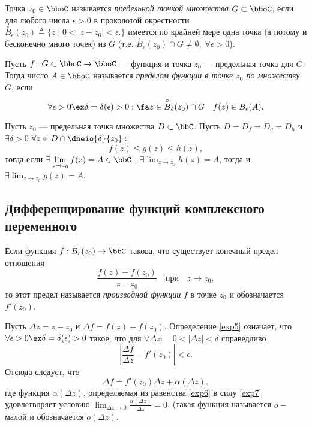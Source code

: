 \begin{defn}
Точка $z_0 \in \bboC$ называется \textit{предельной точкой множества} $G \subset \bboC$, если для любого числа $\epsilon > 0$ в проколотой окрестности $\overset{\circ} {B}_\epsilon(z_0)\triangleq \{z \;\bigl|\; 0<|z-z_0|<\epsilon \bigl.\}$ имеется по крайней мере одна точка (а потому и бесконечно много точек) из $G$ (т.е. $\overset{\circ} {B}_\epsilon(z_0) \cap G \neq \emptyset,\; \forall\epsilon > 0$).
\end{defn}

\begin{defn}
Пусть $f: G\subset \bboC \to \bboC$ --- функция и точка $z_0$ --- предельная точка для $G$. Тогда число $A \in \bboC$ называется \textit{пределом функции в точке $z_0$ по множеству $G$}, если 
$$
\forall \epsilon > 0 \ex \delta = \delta(\epsilon)>0:\fa z \in \overset{\circ} {B}_\delta(z_0)\cap G \quad f(z) \in B_\epsilon(A). 
$$ 
\end{defn}

\begin{thm} 
\label{exp14}
Пусть $z_0$ --- предельная точка множества $D\subset \bbC$. Пусть $D = D_f=D_g=D_h$ и $\exists \delta > 0$ $\forall z \in D \cap \dneio{\delta}{z_0}:$
$$f(z)\le g(z) \le h(z),$$ тогда если $\exists \lim_{z \to z_0}\limits f(z) = A \in \bbC$ , $\exists \lim_{z \to z_0}\limits h(z) = A$, тогда и $\exists \lim_{z \to z_0}\limits g(z) = A$.
\end{thm}

\subsection{Дифференцирование функций комплексного переменного}
\begin{defn}
\label{exp5}
Если функция  $f : B_r(z_0) \to \bbC $ такова, что существует конечный предел отношения
$$
\frac{f(z)-f(z_0)}{z-z_0} \quad\text{при}\quad z \to z_0,
$$
то этот предел называется \textit{производной функции} $f$ в точке $z_0$ и обозначается $f'(z_0)$. 
\end{defn}
Пусть $\Delta z = z - z_0$ и $\Delta f = f(z) - f(z_0)$. Определение \ref{exp5} означает, что $\forall \epsilon > 0 \ex \delta=\delta(\epsilon)>0$ такое, что для $\forall \Delta z:\quad 0 <|\Delta z| <\delta$ справедливо 
\begin{equation}
\label{exp7}
\left|\frac{\Delta f}{\Delta z} - f'(z_0) \right| < \epsilon.
\end{equation}
Отсюда следует, что 
\begin{equation}
\label{exp6}
\Delta f = f'(z_0)\Delta z + \alpha(\Delta z),
\end{equation}
где функция $\alpha(\Delta z)$, определяемая из равенства \eqref{exp6} в силу \eqref{exp7} удовлетворяет условию $\lim_{\Delta z \to 0}\limits \frac{\alpha(\Delta z)}{\Delta z} = 0$. (такая функция называется $o-$малой и обозначается $o(\Delta z)$.

